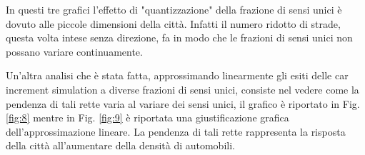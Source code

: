 \documentclass{article}
\begin{document}
        In questi tre grafici l'effetto di "quantizzazione" della frazione di sensi unici è dovuto alle piccole dimensioni della città.
        Infatti il numero ridotto di strade, questa volta intese senza direzione, fa in modo che le frazioni di sensi unici non possano variare
        continuamente.

        \newpage

        Un'altra analisi che è stata fatta, approssimando linearmente gli esiti delle car increment simulation a diverse frazioni di sensi unici, consiste nel vedere
        come la pendenza di tali rette varia al variare dei sensi unici, il grafico è riportato in Fig. \ref{fig:8} mentre in Fig. \ref{fig:9} è riportata 
        una giustificazione grafica dell'approssimazione lineare. La pendenza di tali rette rappresenta la risposta della città all'aumentare della densità di 
        automobili.
\end{document}
